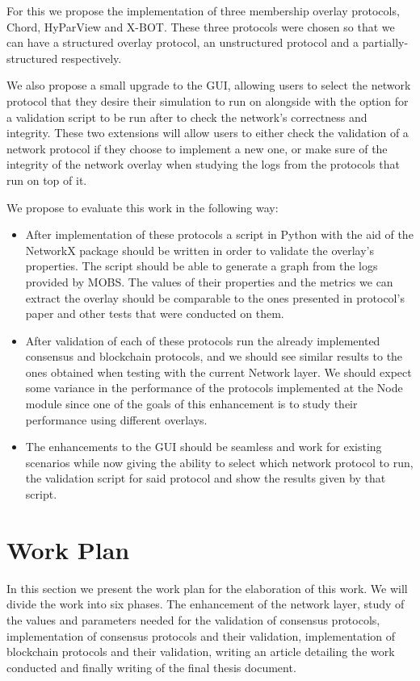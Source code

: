 For this we propose the implementation of three membership overlay protocols, Chord,
HyParView and X-BOT. These three protocols were chosen so that we can have a
structured overlay protocol, an unstructured protocol and a partially-structured
respectively.

We also propose a small upgrade to the GUI, allowing users to select the network
protocol that they desire their simulation to run on alongside with the option for
a validation script to be run after to check the network's correctness and integrity.
These two extensions will allow users to either check the validation of a network
protocol if they choose to implement a new one, or make sure of the integrity of
the network overlay when studying the logs from the protocols that run on top of it.

We propose to evaluate this work in the following way:

\begin{itemize}
  \item After implementation of these protocols a script in Python with the aid of
the NetworkX package should be written in order to validate the overlay's properties.
The script should be able to generate a graph from the logs provided by MOBS.
The values of their properties and the metrics we can extract the overlay should be
comparable to the ones presented in protocol's paper and other tests that were conducted
on them.
  \item After validation of each of these protocols run the already implemented
consensus and blockchain protocols, and we should see similar results to the ones obtained
when testing with the current Network layer. We should expect some variance in the 
performance of the protocols implemented at the Node module since one of the
goals of this enhancement is to study their performance using different overlays.
  \item The enhancements to the GUI should be seamless and work for existing scenarios
while now giving the ability to select which network protocol to run, the validation
script for said protocol and show the results given by that script.
\end{itemize}


\section{Work Plan}\label{sub:work_plan}

In this section we present the work plan for the elaboration of this work.
We will divide the work into six phases. The enhancement of the network layer,
study of the values and parameters needed for the validation of consensus protocols,
implementation of consensus protocols and their validation, implementation of blockchain
protocols and their validation, writing an article detailing the work conducted and
finally writing of the final thesis document.

